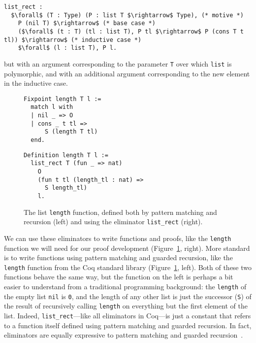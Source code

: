 \begin{lstlisting}
list_rect :
  $\forall$ (T : Type) (P : list T $\rightarrow$ Type), (* motive *)
    P (nil T) $\rightarrow$ (* base case *)
    ($\forall$ (t : T) (tl : list T), P tl $\rightarrow$ P (cons T t tl)) $\rightarrow$ (* inductive case *)
    $\forall$ (l : list T), P l.
\end{lstlisting}
but with an argument corresponding to the parameter \lstinline{T} over which \lstinline{list} is polymorphic,
and with an additional argument corresponding to the new element in the inductive case.

\begin{figure}
\begin{minipage}{0.42\textwidth}
\begin{lstlisting}
Fixpoint length T l :=
  match l with
  | nil _ => O
  | cons _ t tl =>
      S (length T tl)
  end.
\end{lstlisting}
\end{minipage}
\hfill
\begin{minipage}{0.54\textwidth}
\begin{lstlisting}
Definition length T l :=
  list_rect T (fun _ => nat)
    O
    (fun t tl (length_tl : nat) =>
      S length_tl)
    l.
\end{lstlisting}
\end{minipage}
\caption{The list \lstinline{length} function, defined both by pattern matching and recursion (left) and using the eliminator \lstinline{list_rect} (right).}
\label{fig:length}
\end{figure}

We can use these eliminators to write functions and proofs, like the \lstinline{length} function we will need for our proof development (Figure~\ref{fig:length}, right).
More standard is to write functions using pattern matching and guarded recursion, like the \lstinline{length} function from the Coq standard library (Figure~\ref{fig:length}, left).
Both of these two functions behave the same way, but the function on the left is perhaps a bit easier to understand from a traditional programming background:
the \lstinline{length} of the empty list \lstinline{nil} is \lstinline{0}, and the length of any other list
is just the successor (\lstinline{S}) of the result of recursively calling \lstinline{length} on everything but the first element of the list.
Indeed, \lstinline{list_rect}---like all eliminators in Coq---is just a constant that refers to a function itself defined using pattern matching and guarded recursion.
In fact, eliminators are equally expressive to pattern matching and guarded recursion~\cite{TODO}. %


